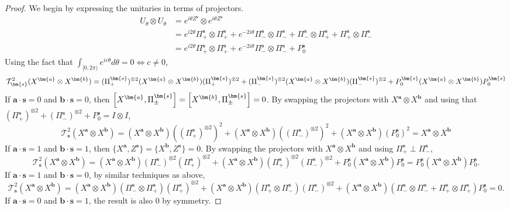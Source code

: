 \documentclass[a4paper,onecolumn,notitlepage,nofootinbib,longbibliography,superscriptaddress, floatfix, pra, aps, 10pt]{revtex4-2}
\newcommand{\vta}{{\bm{a}}}
\newcommand{\vtb}{{\bm{b}}}
\newcommand{\vts}{{\bm{s}}}
\begin{document}
\begin{proof}
We begin by expressing the unitaries in terms of projectors.
\begin{align}
  U_{\theta} \otimes U_{\theta} &= e^{i\theta Z^{\vts}} \otimes e^{i\theta Z^{\vts}} \\
  &= e^{i 2\theta} \Pi_+^{\vts} \otimes \Pi_+^{\vts} + e^{-2i\theta}\Pi_-^{\vts}\otimes \Pi_-^{\vts} + \Pi_-^{\vts} \otimes \Pi_+^{\vts} + \Pi_+^{\vts} \otimes \Pi_-^{\vts}\\
  &= e^{i 2\theta} \Pi_+^{\vts} \otimes \Pi_+^{\vts} + e^{-2i\theta}\Pi_-^{\vts}\otimes \Pi_-^{\vts} + P_0^{\vts}
\end{align}
Using the fact that $\int_{[0,2\pi)} e^{i c\theta} d \theta = 0 \iff c\neq 0$,
\begin{equation}
    \mathcal{T}^2_\vts(X^\vta \otimes X^\vtb) = (\Pi_+^{\vts})^{\otimes 2} (X^\vta \otimes X^\vtb)(\Pi_+^{\vts})^{\otimes 2} + (\Pi_-^{\vts})^{\otimes 2} (X^\vta \otimes X^\vtb) (\Pi_-^{\vts})^{\otimes 2} + P_0^{\vts}(X^\vta \otimes X^\vtb) P_0^{\vts}\\
\end{equation}
If $\vta \cdot \vts = 0$ and $\vtb \cdot \vts = 0$, then $\comm{X^\vta}{\Pi_\pm^{\vts}} = \comm{X^\vtb}{\Pi_\pm^{\vts}} = 0$. By swapping the projectors with $X^\vta \otimes X^\vtb$ and using that $(\Pi_+^{\vts})^{\otimes 2} + (\Pi_-^{\vts})^{\otimes 2} + P_0^{\vts} = I\otimes I$,
\begin{equation}
    \mathcal{T}^2_\vts(X^\vta \otimes X^\vtb) = (X^\vta \otimes X^\vtb) \left((\Pi_+^{\vts})^{\otimes 2}\right)^2 +(X^\vta \otimes X^\vtb) \left((\Pi_-^{\vts})^{\otimes 2}\right)^2 + (X^\vta \otimes X^\vtb) \left(P_0^{\vts}\right)^2 = X^\vta \otimes X^\vtb 
\end{equation}
If $\vta \cdot \vts = 1$ and $\vtb \cdot \vts = 1$, then $\{X^\vta, Z^\vts\} = \{X^\vtb, Z^\vts\} = 0$. By swapping the projectors with $X^\vta \otimes X^\vtb$ and using $\Pi_+^{\vts} \perp \Pi_-^{\vts}$,
\begin{equation}
    \mathcal{T}^2_\vts(X^\vta \otimes X^\vtb) = (X^\vta \otimes X^\vtb)(\Pi_-^{\vts})^{\otimes 2}(\Pi_+^{\vts})^{\otimes 2} +(X^\vta \otimes X^\vtb)(\Pi_+^{\vts})^{\otimes 2} (\Pi_-^{\vts})^{\otimes 2} +P_0^{\vts}(X^\vta \otimes X^\vtb)P_0^{\vts} = P_0^{\vts}(X^\vta \otimes X^\vtb) P_0^{\vts}.
\end{equation}
If $\vta \cdot \vts = 1$ and $\vtb \cdot \vts = 0$, by similar techniques as above, 
\begin{equation}
    \mathcal{T}^2_\vts(X^\vta \otimes X^\vtb) = (X^\vta \otimes X^\vtb) (\Pi_-^{\vts} \otimes \Pi_+^{\vts})(\Pi_+^{\vts})^{\otimes 2} +(X^\vta \otimes X^\vtb)(\Pi_+^{\vts} \otimes \Pi_-^{\vts})(\Pi_-^{\vts})^{\otimes 2} + (X^\vta \otimes X^\vtb)(\Pi_-^{\vts} \otimes \Pi_-^{\vts} + \Pi_+^{\vts} \otimes \Pi_+^{\vts}) P_0^\vts = 0.
\end{equation}
If $\vta \cdot \vts = 0$ and $\vtb \cdot \vts = 1$, the result is also $0$ by symmetry.
\end{proof}
\end{document}
